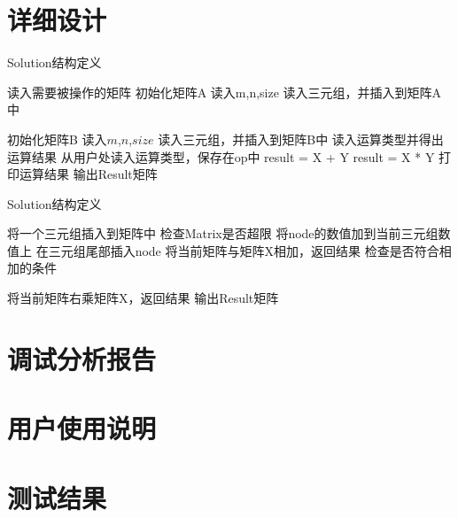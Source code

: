 \section{详细设计}
\begin{algorithm}[htb] 
   \caption{ Solution结构定义 } 
   \label{alg:Framwork} 
   \begin{algorithmic}[1]
      \State 读入需要被操作的矩阵
         \State 初始化矩阵A
         \State 读入m,n,size
            \State 读入三元组，并插入到矩阵A中
         \EndFor

         \State 初始化矩阵B
         \State 读入$m$,$n$,$size$
            \State 读入三元组，并插入到矩阵B中
         \EndFor
      \EndFunction
      \State 读入运算类型并得出运算结果
         \State 从用户处读入运算类型，保存在op中
            \State   result = X + Y
         \Else
            \State   result = X * Y
         \EndIf
      \EndFunction
      \State 打印运算结果
         \State 输出Result矩阵
      \EndFunction

   \end{algorithmic} 
\end{algorithm}



\begin{algorithm}[htb] 
   \caption{ Solution结构定义 } 
   \label{alg:Framwork} 
   \begin{algorithmic}[1]
      \State 将一个三元组插入到矩阵中
         \State 检查Matrix是否超限
               \State 将node的数值加到当前三元组数值上
            \EndIf
         \EndFor
            \State 在三元组尾部插入node
         \EndIf
      \EndFunction
      \State 将当前矩阵与矩阵X相加，返回结果
         \State 检查是否符合相加的条件
         
      \EndFunction
      \State 将当前矩阵右乘矩阵X，返回结果
         \State 输出Result矩阵
      \EndFunction

   \end{algorithmic} 
\end{algorithm}

\section{调试分析报告}

\section{用户使用说明}

\section{测试结果}



